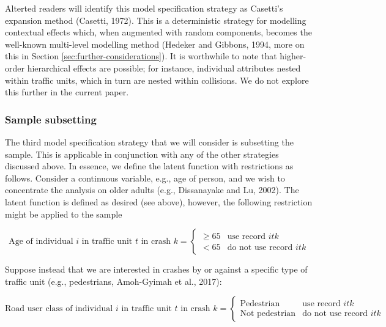\documentclass[]{elsarticle} %
\begin{document}
Alterted readers will identify this model specification strategy as
Casetti's expansion method (Casetti, 1972). This is a deterministic
strategy for modelling contextual effects which, when augmented with
random components, becomes the well-known multi-level modelling method
(Hedeker and Gibbons, 1994, more on this in Section
\ref{sec:further-considerations}). It is worthwhile to note that
higher-order hierarchical effects are possible; for instance, individual
attributes nested within traffic units, which in turn are nested within
collisions. We do not explore this further in the current paper.

\hypertarget{sample-subsetting}{%
\subsubsection{Sample subsetting}\label{sample-subsetting}}

The third model specification strategy that we will consider is
subsetting the sample. This is applicable in conjunction with any of the
other strategies discussed above. In essence, we define the latent
function with restrictions as follows. Consider a continuous variable,
e.g., age of person, and we wish to concentrate the analysis on older
adults (e.g., Dissanayake and Lu, 2002). The latent function is defined
as desired (see above), however, the following restriction might be
applied to the sample

\begin{equation}
\label{eq:sampling-age}
\text{Age of individual } i \text{ in traffic unit } t \text{ in crash } k = 
\begin{cases}
\ge 65 & \text{use record } itk\\
< 65 & \text{do not use record } itk
\end{cases}
\end{equation}

Suppose instead that we are interested in crashes by or against a
specific type of traffic unit (e.g., pedestrians, Amoh-Gyimah et al.,
2017):

\begin{equation}
\label{eq:sampling-pedestrian}
\text{Road user class of individual } i \text{ in traffic unit } t \text{ in crash } k = 
\begin{cases}
\text{Pedestrian} & \text{use record } itk\\
\text{Not pedestrian} & \text{do not use record } itk
\end{cases}
\end{equation}
\end{document}

